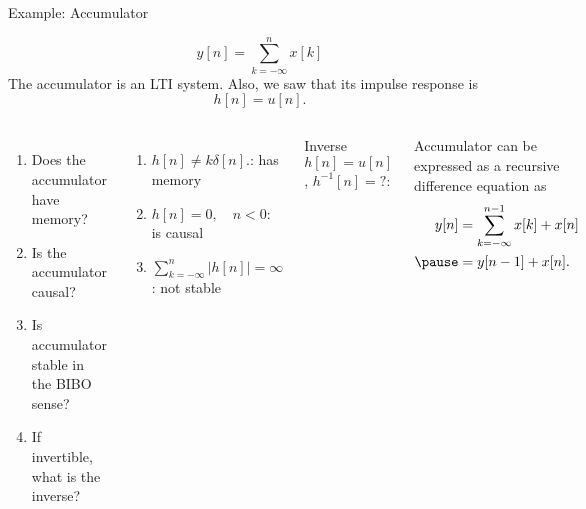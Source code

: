 \begin{frame}{Example: Accumulator}

    \begin{equation*}
        y[n] = \sum_{k=-\infty}^{n}x[k]
    \end{equation*}
    The accumulator is an LTI system. Also, we saw that its impulse response is
    \begin{equation*}
        h[n] = u[n].
    \end{equation*}

    \begin{columns}

            \begin{enumerate}
              \item Does the accumulator have memory?
              \item Is the accumulator causal?
              \item Is accumulator stable in the BIBO sense?
              \item If invertible, what is the inverse?
            \end{enumerate}

            \pause
            {
            \begin{enumerate}[<+->]
                \item $h[n] \neq k\delta[n].$: has memory
                \item $h[n] = 0, \quad n < 0$: is causal
                \item $\sum_{k=-\infty}^{n}|h[n]| = \infty$ : not stable
            \end{enumerate}
            }
        \pause
            {
            Inverse $h[n] = u[n]$, $h^{-1}[n] =?$:\par
            Accumulator can be expressed as a \alert{recursive difference equation} as
            \begin{equation*}
                \begin{split}
                    y[n] &= \sum_{k=-\infty}^{n-1}x[k] + x[n]\\ \pause
                    &= y[n-1] + x[n].
                \end{split}
            \end{equation*}
            }

    \end{columns}

\end{frame}

